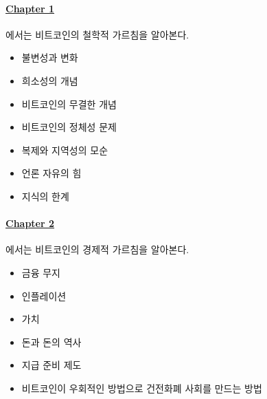 
\paragraph{\hyperref[ch:philosophy]{Chapter 1}}{에서는 비트코인의 철학적 가르침을 알아본다.
\begin{itemize}
\item 불변성과 변화
\item 희소성의 개념
\item 비트코인의 무결한 개념
\item 비트코인의 정체성 문제
\item 복제와 지역성의 모순
\item 언론 자유의 힘
\item 지식의 한계
\end{itemize}}


\paragraph{\hyperref[ch:economics]{Chapter 2}}{에서는 비트코인의 경제적 가르침을 알아본다.
\begin{itemize}
	\item 금융 무지
	\item 인플레이션
	\item 가치
	\item 돈과 돈의 역사
	\item 지급 준비 제도
	\item 비트코인이 우회적인 방법으로 건전화폐 사회를 만드는 방법
\end{itemize}}


